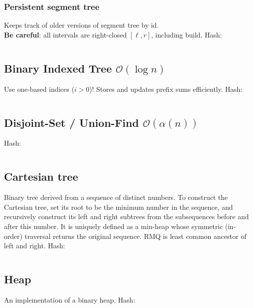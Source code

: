 \documentclass[9pt,a4paper,landscape,oneside]{amsart}
\newcommand{\mintedstyle}[2]{\inputminted{#1}{code/#2}}
\newcommand{\code}[1]{ Hash: 
\mintedstyle{cpp}{#1}}
\begin{document}
\begin{multicols*}{3}
\subsubsection{Persistent segment tree} Keeps track of older versions of segment tree by id.~\\

\textbf{Be careful}: all intervals are right-closed $[\ell,r]$, including build.
\code{datastructures/persistent_segment_tree.cpp}

\subsection{Binary Indexed Tree $\mathcal{O}(\log n)$}

Use one-based indices ($i > 0$)! Stores and updates prefix sums efficiently.
\code{datastructures/bit.cpp}

\subsection{Disjoint-Set / Union-Find $\mathcal{O}(\alpha (n))$}
\code{datastructures/dsu.cpp}


\subsection{Cartesian tree}

Binary tree derived from a sequence of distinct numbers. To construct the Cartesian tree, set its root to be the minimum number in the sequence, and recursively construct its left and right subtrees from the subsequences before and after this number. It is uniquely defined as a min-heap whose symmetric (in-order) traversal returns the original sequence. RMQ is least common ancestor of left and right.
\code{datastructures/cartesian_tree.cpp}

\subsection{Heap}
An implementation of a binary heap.
\code{datastructures/heap.cpp}


\end{multicols*}
\end{document}
